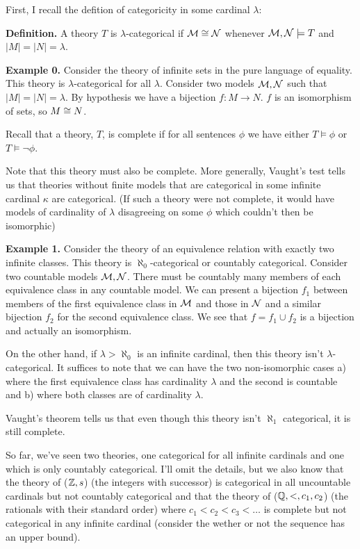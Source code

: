 First, I recall the defition of categoricity in some cardinal \(\lambda\):

\textbf{Definition.} A theory \(T\) is \(\lambda\)-categorical if \(\mathcal{M} \cong \mathcal{N}\) whenever \(\mathcal{M}, \mathcal{N} \models T\) and \(|M| = |N| = \lambda\).

\textbf{Example 0.} Consider the theory of infinite sets in the pure language of equality. This theory is \(\lambda\)-categorical for all \(\lambda\).
Consider two models \(\mathcal{M}, \mathcal{N}\) such that \(|M|=|N|=\lambda\). By hypothesis we have a bijection \(f: M \to N\). \(f\) is an isomorphism of sets, so \(M \cong N\).

Recall that a theory, \(T\), is complete if for all sentences \(\phi\) we have either \(T \models \phi\) or \(T \models \neg \phi\). 

Note that this theory must also be complete. More generally, Vaught's test tells us that theories without finite models that are categorical in some infinite cardinal \(\kappa\) are categorical. (If such a theory were not complete, it would have models of cardinality of \(\lambda\) disagreeing on some \(\phi\) which couldn't then be isomorphic)

\textbf{Example 1.} Consider the theory of an equivalence relation with exactly two infinite classes. This theory is \(\aleph_0\)-categorical or countably categorical. Consider two countable models \(\mathcal{M}, \mathcal{N}\). There must be countably many members of each equivalence class in any countable model. We can present a bijection \(f_1\) between members of the first equivalence class in  \(\mathcal{M}\) and those in \(\mathcal{N}\) and a similar bijection \(f_2\) for the second equivalence class. We see that \(f = f_1 \cup f_2\) is a bijection and actually an isomorphism. 

On the other hand, if \(\lambda > \aleph_0\) is an infinite cardinal, then this theory isn't \(\lambda\)-categorical. It suffices to note that we can have the two non-isomorphic cases a) where the first equivalence class has cardinality \(\lambda\) and the second is countable and b) where both classes are of cardinality \(\lambda\).

Vaught's theorem tells us that even though this theory isn't \(\aleph_1\) categorical, it is still complete. 

So far, we've seen two theories, one categorical for all infinite cardinals and one which is only countably categorical. 
I'll omit the details, but we also know that the theory of (\(\mathbb{Z}, s\)) (the integers with successor) is categorical in all uncountable cardinals but not countably categorical and that the theory of (\(\mathbb{Q}, <, c_1, c_2\)) (the rationals with their standard order) where \(c_1 < c_2 < c_3 < \ldots\) is complete but not categorical in any infinite cardinal (consider the wether or not the sequence has an upper bound). 


